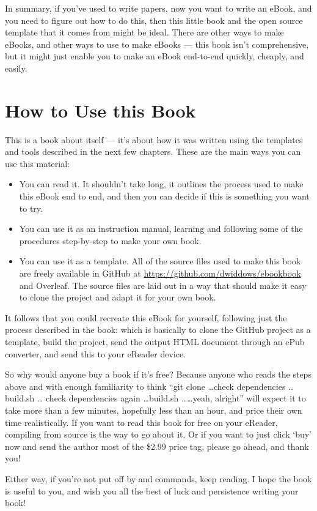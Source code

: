 In summary, if you've used \latex to write papers, now you want to write an eBook,
and you need to figure out how to do this, then this little book and
the open source template that it comes from might be ideal.
There are other ways to make eBooks, and other ways to use
\latex to make eBooks --- this book isn't comprehensive, but it might just
enable you to make an eBook end-to-end quickly, cheaply, and easily.

\section{How to Use this Book}

This is a book about itself --- it's about how it was written using
the templates and tools described in 
the next few chapters. These are the main ways you can use this material:

\begin{itemize}
    \item You can read it. It shouldn't take long, it outlines the process
    used to make this eBook end to end, and then you can decide if this is something you want to try.
    \item You can use it as an instruction manual, learning and following some of the procedures step-by-step to make your own book.
    \item You can use it as a template. All of the source files used to make this book
    are freely available in GitHub at {\small \url{https://github.com/dwiddows/ebookbook}} and Overleaf.
    The source files are laid out in a way that should make it easy to clone the project and adapt it for your own book.
\end{itemize}

It follows that you could recreate this eBook for yourself, following just the process
described in the book: which is basically to clone the GitHub project as a template, build
the project, send the output HTML document through an ePub converter, and send this to
your eReader device.

So why would anyone buy a book if it's free? Because
anyone who reads the steps above and with enough familiarity to think
``git clone \ldots check dependencies \ldots  build.sh \ldots 
check dependencies again \ldots build.sh \ldots  \ldots yeah, alright'' will expect it to take
more than a few minutes, hopefully less than an hour, and price their own time realistically.
If you want to read this book for free on your eReader,
compiling from source is the way to go about it. Or if you want to just click `buy' now and send the author most of the
\$2.99 price tag, please go ahead, and thank you!

Either way, if you're not put off by \latex and 
commands, keep reading. I hope the book is useful to you, and wish you 
all the best of luck and persistence writing your book!
